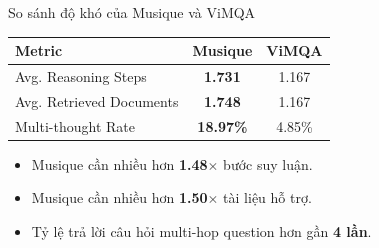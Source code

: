 \documentclass{beamer}
\begin{document}
\begin{frame}{So sánh độ khó của Musique và ViMQA}


\begin{center}
\begin{tabular}{lcc}
\toprule
\textbf{Metric} & \textbf{Musique} & \textbf{ViMQA} \\
\midrule
Avg. Reasoning Steps & \textbf{1.731} & 1.167 \\

Avg. Retrieved Documents & \textbf{1.748} & 1.167 \\

Multi-thought Rate & \textbf{18.97\%} & 4.85\% \\
\bottomrule
\end{tabular}
\end{center}

\vspace{0.2cm}

\begin{itemize}
    \item Musique cần nhiều hơn \textbf{1.48$\times$} bước suy luận.
    \item Musique cần nhiều hơn \textbf{1.50$\times$} tài liệu hỗ trợ.
    \item Tỷ lệ trả lời câu hỏi multi-hop question hơn gần \textbf{4 lần}.
\end{itemize}

\end{frame}

\end{document}
